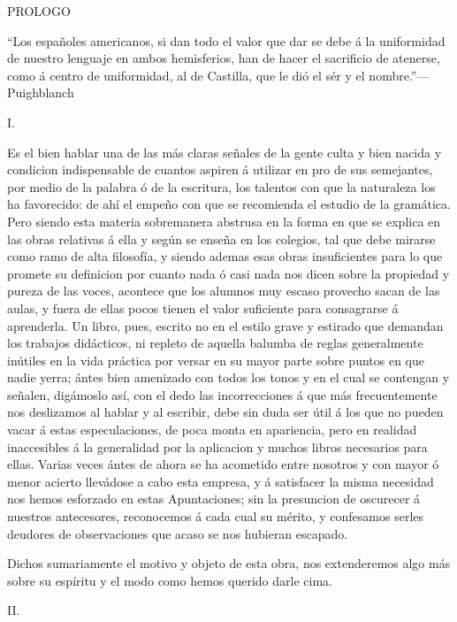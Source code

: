 ﻿\documentclass{book}
\begin{document}
PROLOGO

“Los españoles americanos, si dan todo el valor que dar 
se debe á la uniformidad de nuestro lenguaje en ambos 
hemisferios, han de hacer el sacrificio de atenerse, como 
á centro de uniformidad, al de Castilla, que le dió el sér 
y el nombre.”---Puighblanch

I.

Es el bien hablar una de las más claras señales de la gente culta y bien nacida y condicion indispensable de cuantos aspiren á utilizar en pro de sus semejantes, por medio de la palabra ó de la escritura, los talentos con que la naturaleza los ha favorecido: de ahí el empeño con que se recomienda el estudio de la gramática. Pero siendo esta materia sobremanera abstrusa en la forma en que se explica en las obras relativas á ella y según se enseña en los colegios, tal que debe mirarse como ramo de alta filosofía, y siendo ademas esas obras insuficientes para lo que promete su definicion por cuanto nada ó casi nada nos dicen sobre la propiedad y pureza de las voces, acontece que los alumnos muy escaso provecho sacan de las aulas, y fuera de ellas pocos tienen el valor suficiente para consagrarse á aprenderla. Un libro, pues, escrito no en el estilo grave y estirado que demandan los trabajos didácticos, ni repleto de aquella balumba de reglas generalmente inútiles en la vida práctica por versar en su mayor parte sobre puntos en que nadie yerra; ántes bien amenizado con todos los tonos y en el cual se contengan y señalen, digámoslo así, con el dedo las incorrecciones á que más frecuentemente nos deslizamos al hablar y al escribir, debe sin duda ser útil á los que no pueden vacar á estas especulaciones, de poca monta en apariencia, pero en realidad inaccesibles á la generalidad por la aplicacion y muchos libros necesarios para ellas. Varias veces ántes de ahora se ha acometido entre nosotros y con mayor ó menor acierto llevádose a cabo esta empresa, y á satisfacer la misma necesidad nos hemos esforzado en estas Apuntaciones; sin la presuncion de oscurecer á nuestros antecesores, reconocemos á cada cual su mérito, y confesamos serles deudores de observaciones que acaso se nos hubieran escapado.

Dichos sumariamente el motivo y objeto de esta obra, nos extenderemos algo más sobre su espíritu y el modo como hemos querido darle cima.

II.
\end{document}
